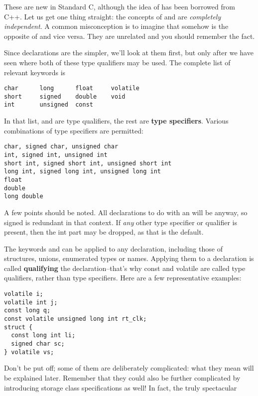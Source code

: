   

  These are new in Standard C, although the idea of \const{}
   has been borrowed from C++. Let us get one thing straight: the concepts
   of \const{} and \volatile{} are \textit{completely
   independent}. A common misconception is to imagine that somehow
   \const{} is the opposite of \volatile{} and vice
   versa. They are unrelated and you should remember the fact.


  Since \const{} declarations are the simpler, we'll look at
   them first, but only after we have seen where both of these type
   qualifiers may be used. The complete list of relevant keywords is


\begin{Verbatim}
char      long      float     volatile
short     signed    double    void
int       unsigned  const
\end{Verbatim}

  In that list, \const{} and \volatile{} are type
   qualifiers, the rest are \textbf{type specifiers}. Various combinations
   of type specifiers are permitted:


\begin{Verbatim}
char, signed char, unsigned char
int, signed int, unsigned int
short int, signed short int, unsigned short int
long int, signed long int, unsigned long int
float
double
long double
\end{Verbatim}

  A few points should be noted. All declarations to do with an
   \kint{} will be \signed{} anyway, so signed is
   redundant in that context. If \textit{any} other type specifier or
   qualifier is present, then the int part may be dropped, as that is the
   default.


  The keywords \const{} and \volatile{} can be
   applied to any declaration, including those of structures, unions,
   enumerated types or \typedef{} names. Applying them to
   a declaration is called \textbf{qualifying} the declaration--that's
   why const and volatile are called type qualifiers, rather than type
   specifiers. Here are a few representative examples:


\begin{Verbatim}
volatile i;
volatile int j;
const long q;
const volatile unsigned long int rt_clk;
struct {
  const long int li;
  signed char sc;
} volatile vs;
\end{Verbatim}

  Don't be put off; some of them are deliberately complicated: what they
   mean will be explained later. Remember that they could also be further
   complicated by introducing storage class specifications as well! In fact,
   the truly spectacular


